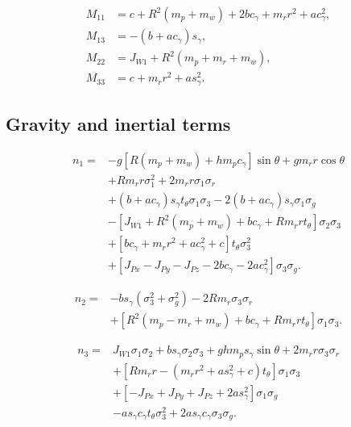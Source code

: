\documentclass[10pt]{article}
\numberwithin{equation}{section}
\begin{document}
\begin{equation}
\begin{aligned}
M_{11}&=c+R^2(m_p+m_w)+2bc_\gamma+m_rr^2+ac_\gamma^2,\\
M_{13}&=-(b+ac_\gamma)s_\gamma,\\
M_{22}&=J_{W1}+R^2(m_p+m_r+m_w),\\
M_{33}&=c+m_rr^2+as_\gamma^2.
\end{aligned}
\end{equation}
\subsection*{Gravity and inertial terms}
\begin{equation}
\begin{aligned}
n_1={}&-g\left[R(m_p+m_w)+hm_pc_\gamma\right]\sin\theta
       +gm_rr\cos\theta\\
&+Rm_rr\sigma_1^2+2m_rr\sigma_1\sigma_r\\
&+(b+ac_\gamma)s_\gamma t_\theta\sigma_1\sigma_3
 -2(b+ac_\gamma)s_\gamma\sigma_1\sigma_g\\
&-\left[J_{W1}+R^2(m_p+m_w)+bc_\gamma+Rm_rrt_\theta\right]\sigma_2\sigma_3\\
&+\left[bc_\gamma+m_rr^2+ac_\gamma^2+c\right]t_\theta\sigma_3^2\\
&+\left[J_{Px}-J_{Py}-J_{Pz}-2bc_\gamma-2ac_\gamma^2\right]\sigma_3\sigma_g.
\end{aligned}
\end{equation}

\begin{equation}
\begin{aligned}
n_2={}&-bs_\gamma(\sigma_3^2+\sigma_g^2)-2Rm_r\sigma_3\sigma_r\\
&+\left[R^2(m_p-m_r+m_w)+bc_\gamma+Rm_rrt_\theta\right]\sigma_1\sigma_3.
\end{aligned}
\end{equation}

\begin{equation}
\begin{aligned}
n_3={}&J_{W1}\sigma_1\sigma_2+bs_\gamma\sigma_2\sigma_3
       +ghm_ps_\gamma\sin\theta+2m_rr\sigma_3\sigma_r\\
&+\left[Rm_rr-(m_rr^2+as_\gamma^2+c)t_\theta\right]\sigma_1\sigma_3\\
&+\left[-J_{Px}+J_{Py}+J_{Pz}+2as_\gamma^2\right]\sigma_1\sigma_g\\
&-as_\gamma c_\gamma t_\theta\sigma_3^2
 +2as_\gamma c_\gamma\sigma_3\sigma_g.
\end{aligned}
\end{equation}
\end{document}
